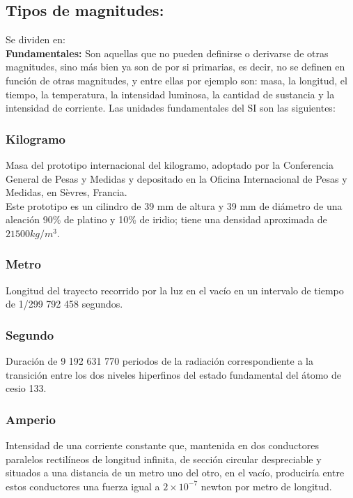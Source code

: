 \subsection{Tipos de magnitudes:}

Se dividen en:\\

\textbf{Fundamentales:} Son aquellas que no pueden definirse o derivarse de otras magnitudes, sino más bien ya son de por si 
primarias, es decir, no se definen en función de otras magnitudes, y entre ellas por ejemplo son: masa, la longitud, el tiempo, 
la 
temperatura, la intensidad luminosa, la cantidad de sustancia y la intensidad de corriente. Las unidades fundamentales del SI 
son las siguientes:

\subsubsection{Kilogramo}

Masa del prototipo internacional del kilogramo, adoptado por la Conferencia General de Pesas y Medidas y depositado en la Oficina 
Internacional de Pesas y Medidas, en Sèvres, Francia.\\

Este prototipo es un cilindro de 39 mm de altura y 39 mm de diámetro de una aleación 90\% de platino y 10\% de iridio; tiene 
una densidad aproximada de $21 500 kg/m^3$. 

\subsubsection{Metro}

Longitud del trayecto recorrido por la luz en el vacío en un intervalo de tiempo de 1/299 792 458 segundos.

\subsubsection{Segundo}

Duración de 9 192 631 770 periodos de la radiación correspondiente a la transición entre los dos niveles hiperfinos del estado 
fundamental del átomo de cesio 133. 

\subsubsection{Amperio}

Intensidad de una corriente constante que, mantenida en dos conductores paralelos rectilíneos de longitud infinita, de sección 
circular despreciable y situados a una distancia de un metro uno del otro, en el vacío, produciría entre estos conductores una 
fuerza igual a $2 × 10^{−7}$ newton por metro de longitud. 


